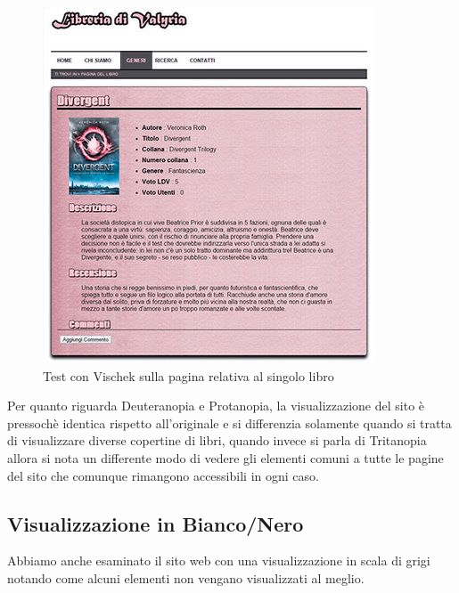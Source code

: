 \begin{figure}[H]
\begin{minipage}{0.45\textwidth}
\end{minipage}
\hspace{\fill}
\begin{minipage}{0.45\textwidth}
\includegraphics[width=\linewidth]{images/screen/tritanope.jpg}
\end{minipage}
\caption{Test con Vischek sulla pagina relativa al singolo libro}\label{multiavp}
\end{figure}

Per quanto riguarda Deuteranopia e Protanopia, la visualizzazione del sito è pressochè identica rispetto all'originale e si differenzia solamente quando si tratta di visualizzare diverse copertine di libri, quando invece si parla di Tritanopia allora si nota un differente modo di vedere gli elementi comuni a tutte le pagine del sito che comunque rimangono accessibili in ogni caso.

\subsection{Visualizzazione in Bianco/Nero}
Abbiamo anche esaminato il sito web con una visualizzazione in scala di grigi notando come alcuni elementi non vengano visualizzati al meglio.

